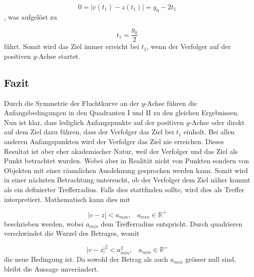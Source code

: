 \begin{equation}
    0
    =
    |v(t_1)-z(t_1)|
    =
    y_0-2t_1
\end{equation}
%
, was aufgelöst zu

\begin{equation}
    t_1
    =
    \frac{y_0}{2}
\end{equation}
%
führt.
Somit wird das Ziel immer erreicht bei $t_1$, wenn der Verfolger auf der positiven $y$-Achse startet.
\subsection{Fazit}
Durch die Symmetrie der Fluchtkurve an der $y$-Achse führen die Anfangsbedingungen in den Quadranten \RN{1} und \RN{2} zu den gleichen Ergebnissen. Nun ist klar, dass lediglich Anfangspunkte auf der positiven $y$-Achse oder direkt auf dem Ziel dazu führen, dass der Verfolger das Ziel bei $t_1$ einholt.
Bei allen anderen Anfangspunkten wird der Verfolger das Ziel nie erreichen.
Dieses Resultat ist aber eher akademischer Natur, weil der Verfolger und das Ziel als Punkt betrachtet wurden.
Wobei aber in Realität nicht von Punkten sondern von Objekten mit einer räumlichen Ausdehnung gesprochen werden kann.
Somit wird in einer nächsten Betrachtung untersucht, ob der Verfolger dem Ziel näher kommt als ein definierter Trefferradius.
Falls dies stattfinden sollte, wird dies als Treffer interpretiert.
Mathematisch kann dies mit

\begin{equation}
    |v-z|<a_{min} \text{,}\quad a_{min}\in\mathbb{R}^+
\end{equation}
%
beschrieben werden, wobei $a_{min}$ dem Trefferradius entspricht.
Durch quadrieren verschwindet die Wurzel des Betrages, womit

\begin{equation}
    |v-z|^2<a_{min}^2 \text{,}\quad a_{min}\in \mathbb{R}^+
\end{equation}
%
die neue Bedingung ist.
Da sowohl der Betrag als auch $a_{min}$ grösser null sind, bleibt die Aussage unverändert.





